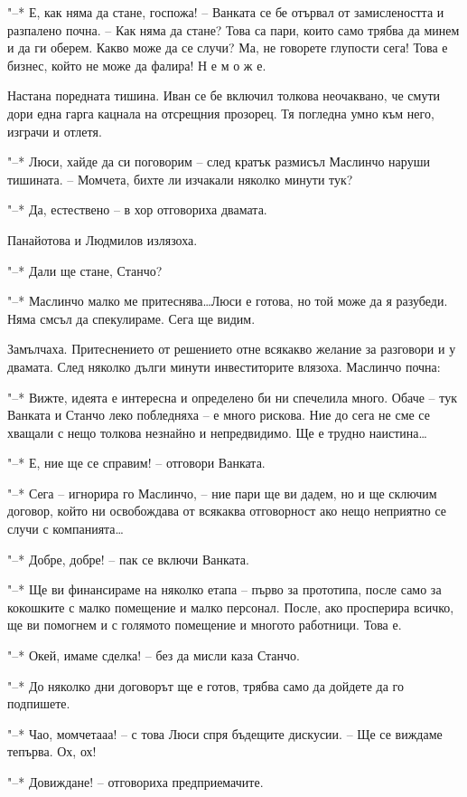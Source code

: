 \documentclass[ebook,openany,12pt]{memoir}
\begin{document}
"--* Е, как няма да стане, госпожа! – Ванката се бе отървал от замислеността и разпалено почна. – Как няма да стане? Това са пари, които само трябва да минем и да ги оберем. Какво може да се случи? Ма, не говорете глупости сега! Това е бизнес, който не може да фалира! Н е  м о ж е.

Настана поредната тишина. Иван се бе включил толкова неочаквано, че смути дори една гарга кацнала на отсрещния прозорец. Тя погледна умно към него, изграчи и отлетя.

"--* Люси, хайде да си поговорим – след кратък размисъл Маслинчо наруши тишината. – Момчета, бихте ли изчакали няколко минути тук?

"--* Да, естествено – в хор отговориха двамата.

Панайотова и Людмилов излязоха.

"--* Дали ще стане, Станчо?

"--* Маслинчо малко ме притеснява\ldots Люси е готова, но той може да я разубеди. Няма смсъл да спекулираме. Сега ще видим.

Замълчаха. Притеснението от решението отне всякакво желание за разговори и у двамата. След няколко дълги минути инвеститорите влязоха. Маслинчо почна:

"--* Вижте, идеята е интересна и определено би ни спечелила много. Обаче – тук Ванката и Станчо леко побледняха – е много рискова. Ние до сега не сме се хващали с нещо толкова незнайно и непредвидимо. Ще е трудно наистина\ldots

"--* Е, ние ще се справим! – отговори Ванката.

"--* Сега -- игнорира го Маслинчо, – ние пари ще ви дадем, но и ще сключим договор, който ни освобождава от всякаква отговорност ако нещо неприятно се случи с компанията\ldots

"--* Добре, добре! – пак се включи Ванката.

"--* Ще ви финансираме на няколко етапа – първо за прототипа, после само за кокошките с малко помещение и малко персонал. После, ако просперира всичко, ще ви помогнем и с голямото помещение и многото работници. Това е.

"--* Окей, имаме сделка! – без да мисли каза Станчо.

"--* До няколко дни договорът ще е готов, трябва само да дойдете да го подпишете.

"--* Чао, момчетааа! – с това Люси спря бъдещите дискусии. – Ще се виждаме тепърва. Ох, ох!

"--* Довиждане! – отговориха предприемачите.
\end{document}
